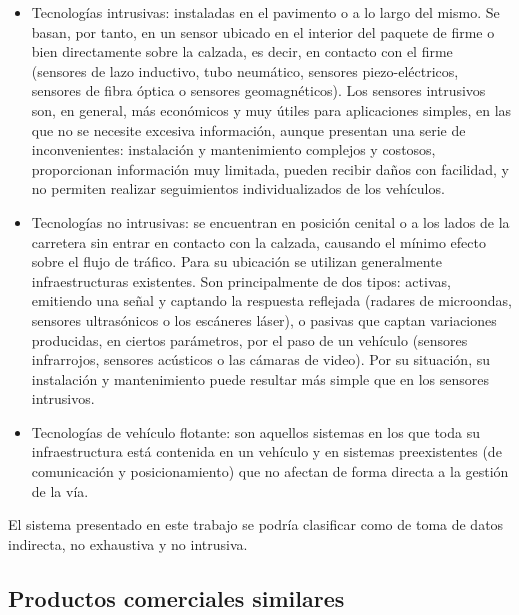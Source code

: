 \documentclass[twocolumn,twoside]{Jornadas}
\begin{document}
\begin{itemize}
 \item Tecnologías intrusivas: instaladas en el pavimento o a lo largo del mismo. Se basan, por tanto, en un sensor ubicado en el interior del 
paquete de firme o bien directamente sobre la calzada, es decir, en contacto con el firme (sensores de lazo inductivo, tubo neumático, 
sensores piezo-eléctricos, sensores de fibra óptica o sensores geomagnéticos). Los sensores intrusivos son, en general, más económicos 
y muy útiles para aplicaciones simples, en las que no se necesite excesiva información, aunque presentan una serie de inconvenientes: instalación y mantenimiento complejos y costosos, proporcionan información muy limitada, pueden recibir daños con facilidad, y no permiten realizar seguimientos individualizados de los vehículos.

 \item Tecnologías no intrusivas: se encuentran en posición cenital o a los lados de la carretera sin entrar en contacto con la calzada, 
causando el mínimo efecto sobre el flujo de tráfico. Para su ubicación se utilizan generalmente infraestructuras existentes. 
Son principalmente de dos tipos: activas, emitiendo una señal y captando la respuesta reflejada (radares de microondas, 
sensores ultrasónicos o los escáneres láser), o pasivas que captan variaciones producidas, en ciertos parámetros, 
por el paso de un vehículo (sensores infrarrojos, sensores acústicos o las cámaras de video). 
Por su situación, su instalación y mantenimiento puede resultar más simple que en los sensores intrusivos.

 \item Tecnologías de vehículo flotante: son aquellos sistemas en los que toda su infraestructura está contenida en un vehículo y en sistemas preexistentes (de comunicación y posicionamiento) que no afectan de forma directa a la gestión de la vía.

\end{itemize}


El sistema presentado en este trabajo se podría clasificar como de
toma de datos indirecta, no exhaustiva y no intrusiva. %


\subsection{Productos comerciales similares}
\end{document}
